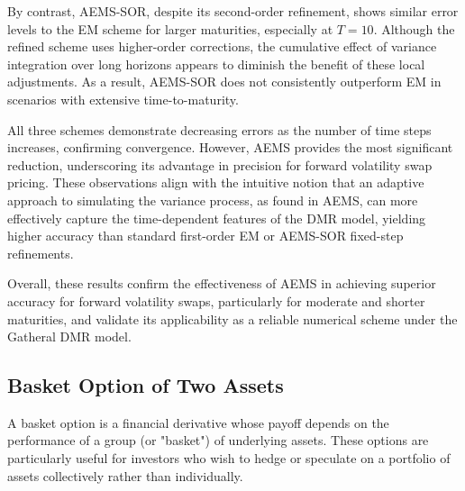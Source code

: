 \documentclass[graybox]{svmult}
\begin{document}
By contrast, AEMS-SOR, despite its second-order refinement, shows similar error levels to the EM scheme for larger maturities, especially at $T=10$. Although the refined scheme uses higher-order corrections, the cumulative effect of variance integration over long horizons appears to diminish the benefit of these local adjustments. As a result, AEMS-SOR does not consistently outperform EM in scenarios with extensive time-to-maturity.

All three schemes demonstrate decreasing errors as the number of time steps increases, confirming convergence. However, AEMS provides the most significant reduction, underscoring its advantage in precision for forward volatility swap pricing. These observations align with the intuitive notion that an adaptive approach to simulating the variance process, as found in AEMS, can more effectively capture the time-dependent features of the DMR model, yielding higher accuracy than standard first-order EM or AEMS-SOR fixed-step refinements.

Overall, these results confirm the effectiveness of AEMS in achieving superior accuracy for forward volatility swaps, particularly for moderate and shorter maturities, and validate its applicability as a reliable numerical scheme under the Gatheral DMR model.





\subsection{Basket Option of Two Assets}

A basket option is a financial derivative whose payoff depends on the performance of a group (or "basket") of underlying assets. These options are particularly useful for investors who wish to hedge or speculate on a portfolio of assets collectively rather than individually.
\end{document}
